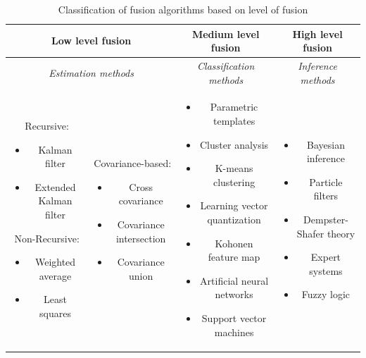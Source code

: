 \begin{table}[ht!]
\footnotesize
\centering
\begin{tabular}{|c|c|c|c|}
\hline
\multicolumn{2}{|c|}{\textbf{Low level fusion}} & \textbf{Medium level fusion} & \textbf{High level fusion} \\
\hline
\multicolumn{2}{|c|}{\textit{Estimation methods}} & \textit{Classification methods} & \textit{Inference methods} \\
\hline
\parbox{2.5cm}{
	Recursive:
	\begin{itemize}[leftmargin=.07in]
		\item Kalman filter
		\item Extended Kalman filter
	\end{itemize}
	Non-Recursive:
	\begin{itemize}[leftmargin=.07in]
		\item Weighted average
		\item Least squares
	\end{itemize}
	}
 & 
 \parbox{2.5cm}{	 
 	Covariance-based:
	\begin{itemize}[leftmargin=.07in]
		\item Cross covariance
		\item Covariance intersection
		\item Covariance union
	\end{itemize}
	}
&
 \parbox{3cm}{	 
	\begin{itemize}[leftmargin=.07in, noitemsep]
		\item Parametric templates
		\item Cluster analysis
		\item K-means clustering
		\item Learning vector quantization
		\item Kohonen feature map
		\item Artificial neural networks
		\item Support vector machines
	\end{itemize}
	}
&
\parbox{3cm}{	 
	\begin{itemize}[leftmargin=.07in, noitemsep]
		\item Bayesian inference
		\item Particle filters
		\item Dempster-Shafer theory
		\item Expert systems
		\item Fuzzy logic
	\end{itemize}
	} \\
\hline
\end{tabular}
\caption{Classification of fusion algorithms based on level of fusion}
\label{fusionAlgClasLuo}
\end{table}

